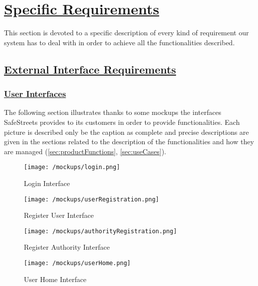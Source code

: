 \section[Specific Requirements]{\hyperlink{toc}{Specific Requirements}}
	\label{sec:specificRequirements}
	This section is devoted to a specific description of every kind of requirement our system has to deal with in order to achieve all the functionalities described.

\subsection[External Interface Requirements]{\hyperlink{toc}{External Interface Requirements}}
	\label{sec:externalInterfaceRequirements}
	\subsubsection[User Interfaces]{\hyperlink{toc}{User Interfaces}}
	\label{sec:userInterfaces}
	The following section illustrates thanks to some mockups the interfaces SafeStreets provides to its customers in order to provide functionalities. Each picture is described only be the caption as complete and precise descriptions are given in the sections related to the description of the functionalities and how they are managed (\ref{sec:productFunctions}, \ref{sec:useCases}).
	
	\begin{figure}[h]
		\centering
		\begin{minipage}{0.5\textwidth}
			\centering
			\texttt{[image: /mockups/login.png]}
			\caption{Login Interface}
		\end{minipage}\hfill
		\begin{minipage}{0.5\textwidth}
			\centering
			\texttt{[image: /mockups/userRegistration.png]}
			\caption{Register User Interface}
		\end{minipage}
	\end{figure}

	\begin{figure}[h]
		\centering
		\begin{minipage}{0.5\textwidth}
			\centering
			\texttt{[image: /mockups/authorityRegistration.png]}
			\caption{Register Authority Interface}
		\end{minipage}\hfill
		\begin{minipage}{0.5\textwidth}
			\centering
			\texttt{[image: /mockups/userHome.png]}
			\caption{User Home Interface}
		\end{minipage}
	\end{figure}


